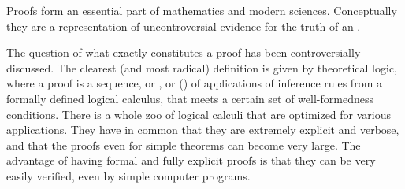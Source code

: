 Proofs form an essential part of mathematics and modern sciences.
Conceptually they are a representation of uncontroversial evidence for the truth
of an {}.

The question of what exactly constitutes a proof has been controversially
discussed. The clearest (and most radical) definition is given by theoretical
logic, where a proof is a sequence, or {}, or {} ({}) of
applications of inference rules from a formally defined logical calculus, that
meets a certain set of well-formedness conditions.  There is a whole zoo of
logical calculi that are optimized for various applications. They have in common
that they are extremely explicit and verbose, and that the proofs even for simple
theorems can become very large. The advantage of having formal and fully explicit
proofs is that they can be very easily verified, even by simple computer programs.

